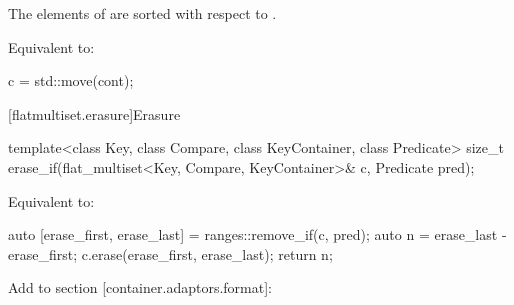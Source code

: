 \begin{addedblock}
\begin{itemdescr}
\pnum \expects
The elements of  are sorted with respect to .

\pnum
\effects Equivalent to:
\begin{codeblock}
c = std::move(cont);
\end{codeblock}
\end{itemdescr}

[flatmultiset.erasure]{Erasure}

%
\begin{itemdecl}
template<class Key, class Compare, class KeyContainer, class Predicate>
  size_t erase_if(flat_multiset<Key, Compare, KeyContainer>& c, Predicate pred);
\end{itemdecl}

\begin{itemdescr}
\pnum
\effects
Equivalent to:
\begin{codeblock}
  auto [erase_first, erase_last] = ranges::remove_if(c, pred);
  auto n = erase_last - erase_first;
  c.erase(erase_first, erase_last);
  return n;
\end{codeblock}
\end{itemdescr}
\end{addedblock}

\noindent\makebox[\linewidth]{\rule{\textwidth}{0.4pt}}

Add to section [container.adaptors.format]:


